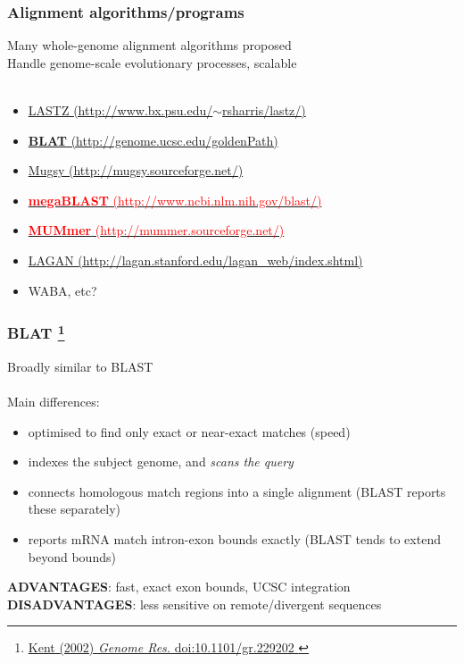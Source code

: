 %
\begin{frame}
  \frametitle{Alignment algorithms/programs}
  \textcolor{hutton_green}{Many whole-genome alignment algorithms proposed} \\
  Handle genome-scale evolutionary processes, scalable \\~\\
  \begin{itemize}
    \item \href{http://www.bx.psu.edu/~rsharris/lastz/}{LASTZ (http://www.bx.psu.edu/$\sim$rsharris/lastz/)}
    \item \href{http://genome.ucsc.edu/goldenPath/help/blatSpec.html}{\textcolor{hutton_blue}{\textbf{BLAT} (http://genome.ucsc.edu/goldenPath)}}
    \item \href{http://mugsy.sourceforge.net/}{Mugsy (http://mugsy.sourceforge.net/)}
    \item \href{http://www.ncbi.nlm.nih.gov/blast/html/megablast.html}{\textcolor{red}{\textbf{megaBLAST} (http://www.ncbi.nlm.nih.gov/blast/)}}
    \item \href{http://mummer.sourceforge.net/}{\textcolor{red}{\textbf{MUMmer} (http://mummer.sourceforge.net/)}}
    \item \href{http://lagan.stanford.edu/lagan_web/index.shtml}{LAGAN (http://lagan.stanford.edu/lagan\_web/index.shtml)}
    \item WABA, etc?
  \end{itemize}
\end{frame}

%
\begin{frame}
  \frametitle{BLAT
  \footnote{\tiny{\href{http://dx.doi.org/10.1101/gr.229202
}{Kent (2002) \textit{Genome Res.} doi:10.1101/gr.229202
}}}
  }
  Broadly similar to BLAST \\~\\
  \textcolor{hutton_blue}{Main differences:}
  \begin{itemize}
    \item optimised to find \textcolor{hutton_purple}{only exact or near-exact matches} (speed)
    \item indexes the subject genome, and \textcolor{hutton_purple}{\textit{scans the query}}
    \item connects homologous match regions into a single alignment (BLAST reports these separately)
    \item reports mRNA match intron-exon bounds exactly (BLAST tends to extend beyond bounds)
  \end{itemize}
  \textcolor{hutton_green}{\textbf{ADVANTAGES}: fast, exact exon bounds, UCSC integration}
  \textcolor{RawSienna}{\textbf{DISADVANTAGES}: less sensitive on remote/divergent sequences}
\end{frame}

